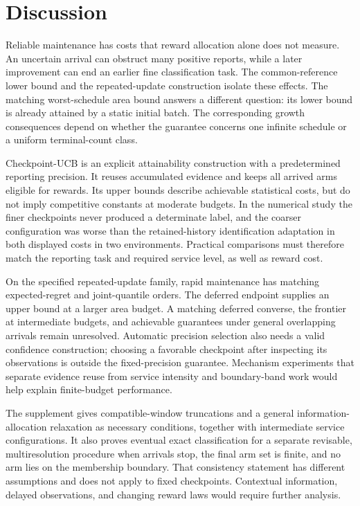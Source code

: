 \section{Discussion}
\label{sec:discussion}

Reliable maintenance has costs that reward allocation alone does not
measure. An uncertain arrival can obstruct many positive reports, while
a later improvement can end an earlier fine classification task. The
common-reference lower bound and the repeated-update construction
isolate these effects. The matching worst-schedule area bound answers a
different question: its lower bound is already attained by a static
initial batch. The corresponding growth consequences depend on whether
the guarantee concerns one infinite schedule or a uniform terminal-count
class.

Checkpoint-UCB is an explicit attainability construction with a
predetermined reporting precision. It reuses accumulated evidence and
keeps all arrived arms eligible for rewards. Its upper bounds describe
achievable statistical costs, but do not imply competitive constants at
moderate budgets. In the numerical study the finer checkpoints never
produced a determinate label, and the coarser configuration was worse
than the retained-history identification adaptation in both displayed
costs in two environments. Practical comparisons must therefore match
the reporting task and required service level, as well as reward cost.

On the specified repeated-update family, rapid maintenance has matching
expected-regret and joint-quantile orders. The deferred endpoint supplies
an upper bound at a larger area budget. A matching deferred converse,
the frontier at intermediate budgets, and achievable guarantees under
general overlapping arrivals remain unresolved. Automatic precision
selection also needs a valid confidence construction; choosing a
favorable checkpoint after inspecting its observations is outside the
fixed-precision guarantee. Mechanism experiments that separate evidence
reuse from service intensity and boundary-band work would help explain
finite-budget performance.

The supplement gives compatible-window truncations and a general
information-allocation relaxation as necessary conditions, together with
intermediate service configurations. It also proves eventual exact
classification for a separate revisable, multiresolution procedure when
arrivals stop, the final arm set is finite, and no arm lies on the
membership boundary. That consistency statement has different
assumptions and does not apply to fixed checkpoints. Contextual
information, delayed observations, and changing reward laws would require
further analysis.

